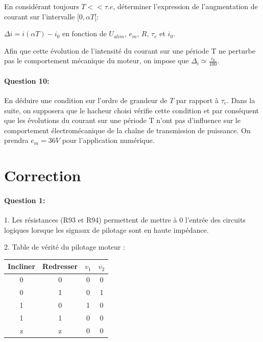 En considérant toujours $T << \tau.e$, déterminer l'expression de l'augmentation de courant sur l'intervalle $[0, \alpha T[$:

$\Delta i =i(\alpha T)-i_0$  en fonction de $U_{alim}$, $e_m$, $R$, $\tau_e$ et $i_0$.

Afin que cette évolution de l'intensité du courant sur une période T ne perturbe pas le comportement
mécanique du moteur, on impose que $\Delta_i \simeq \frac{i_0}{100}$.

\paragraph{Question 10:}

En déduire une condition sur l'ordre de grandeur de $T$ par rapport à $\tau_e$. Dans la suite, on supposera que le hacheur choisi vérifie cette condition et par conséquent que les évolutions du courant sur une période T n'ont pas d'influence sur le comportement électromécanique de la chaîne de transmission de puissance. On prendra $e_m=36V$ pour l'application numérique.

\ifdef{\public}{}

\newpage

\pagestyle{correction}

\section{Correction}

\paragraph{Question 1:} 

1. Les résistances (R93 et R94) permettent de mettre à 0 l'entrée des circuits logiques lorsque les signaux de pilotage sont en haute impédance.

2. Table de vérité du pilotage moteur :

\begin{center}
\begin{tabular}{|c|c|c|c|}
\hline
Incliner & Redresser & $v_1$ & $v_2$ \\
\hline
0 & 0 & 0 & 0 \\
\hline
0 & 1 & 0 & 1 \\
\hline
1 & 0 & 1 & 0 \\
\hline
1 & 1 & 0 & 0 \\
\hline
z & z & 0 & 0 \\
\hline
\end{tabular}
\end{center}

